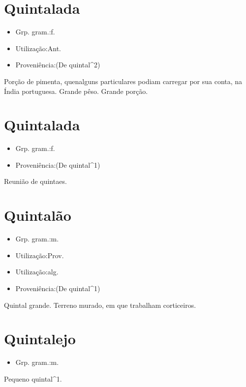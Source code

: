 \section{Quintalada}
\begin{itemize}
\item {Grp. gram.:f.}
\end{itemize}
\begin{itemize}
\item {Utilização:Ant.}
\end{itemize}
\begin{itemize}
\item {Proveniência:(De \textunderscore quintal\textunderscore ^2)}
\end{itemize}
Porção de pimenta, quenalguns particulares podiam carregar por sua conta, na Índia portuguesa.
Grande pêso.
Grande porção.
\section{Quintalada}
\begin{itemize}
\item {Grp. gram.:f.}
\end{itemize}
\begin{itemize}
\item {Proveniência:(De \textunderscore quintal\textunderscore ^1)}
\end{itemize}
Reunião de quintaes.
\section{Quintalão}
\begin{itemize}
\item {Grp. gram.:m.}
\end{itemize}
\begin{itemize}
\item {Utilização:Prov.}
\end{itemize}
\begin{itemize}
\item {Utilização:alg.}
\end{itemize}
\begin{itemize}
\item {Proveniência:(De \textunderscore quintal\textunderscore ^1)}
\end{itemize}
Quintal grande.
Terreno murado, em que trabalham corticeiros.
\section{Quintalejo}
\begin{itemize}
\item {Grp. gram.:m.}
\end{itemize}
Pequeno quintal^1.
